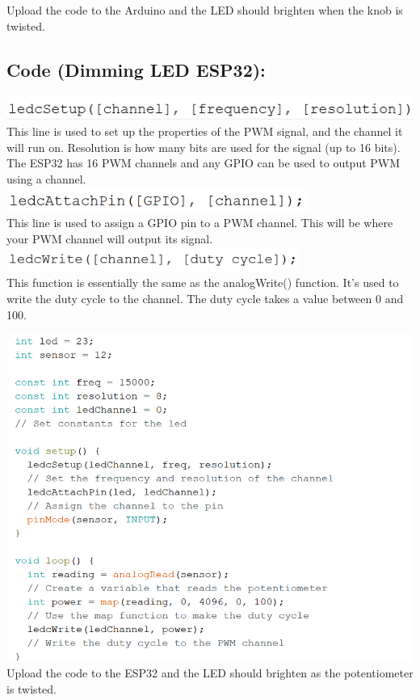 \documentclass[a4paper,12pt]{report}
\newcommand{\diagramWidth}{150mm}
\begin{document}
    Upload the code to the Arduino and the LED should brighten when the knob is twisted.

\newpage
\subsection*{Code (Dimming LED ESP32):}
    \begin{mdframed}[linewidth = 3, linecolor = turbo_purple]
        \includegraphics[height = 8mm]{Assets/ledcsetup.png} \\
         This line is used to set up the properties of the PWM signal, and the channel it will run on. Resolution is how many bits are used for the signal (up to 16 bits). The ESP32 has 16 PWM channels and any GPIO can be used to output PWM using a channel. \\
         \includegraphics[height = 8mm]{Assets/ledcattach.png} \\ 
         This line is used to assign a GPIO pin to a PWM channel. This will be where your PWM channel will output its signal. \\
         \includegraphics[height = 8mm]{Assets/ledcwrite.png} \\ 
         This function is essentially the same as the analogWrite() function. It’s used to write the duty cycle to the channel. The duty cycle takes a value between 0 and 100.  \\
    \end{mdframed}
    \includegraphics[width = \diagramWidth]{Assets/esp_pot.png} \\
    Upload the code to the ESP32 and the LED should brighten as the potentiometer is twisted. 
\end{document}
